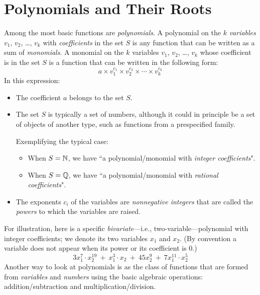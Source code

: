 \section{Polynomials and Their Roots}
\label{sec:polynomials}

 
    
 
  

Among the most basic functions are {\it polynomials}.  A polynomial on the $k$ {\it variables} $v_1$, $v_2$, \ldots, $v_k$ with {\it coefficients} in the set $S$ is any function that can be written as a sum of {\it monomials}.  A monomial on the $k$ variables $v_1$, $v_2$, \ldots, $v_k$ whose coefficient is in the set $S$ is a function that can be written in the following form:
\begin{equation}
\label{eq:monomial}
a \times v_1^{c_1} \times v_2^{c_2} \times \cdots \times v_k^{c_k}
\end{equation}
In this expression: 
\begin{itemize}
\item
The coefficient $a$ belongs to the set $S$.
\medskip\item
The set $S$ is typically a set of numbers, although it could in principle be a set of objects of another type, such as functions from a prespecified family.

\smallskip

Exemplifying the typical case:
  \begin{itemize}
  \item
When $S = \mathbb{N}$, we have ``a polynomial/monomial with {\em integer coefficients}".
  \medskip\item
When $S = \mathbb{Q}$, we have ``a polynomial/monomial with {\em rational coefficients}".
  \end{itemize}
\medskip\item
The exponents $c_i$ of the variables are {\em nonnegative integers} that are called the {\it powers} to which the variables are raised.
\end{itemize}
For illustration, here is a specific {\em bivariate}---i.e., two-variable---polynomial with integer coefficients; we denote its two variables $x_1$ and $x_2$.  (By convention a variable does not appear when its power or its coefficient is $0$.)
\[ 
3 x_1^7 \cdot x_2^{19} \ + \ x_1^3 \cdot x_2 \ + \ 45 x_2^{9} \ + \ 7 x_1^{11} \cdot x_2^{5}
\]
Another way to look at polynomials is as the class of functions that are formed from {\it variables} and {\it numbers} using the basic algebraic operations: addition/subtraction and
multiplication/division.


